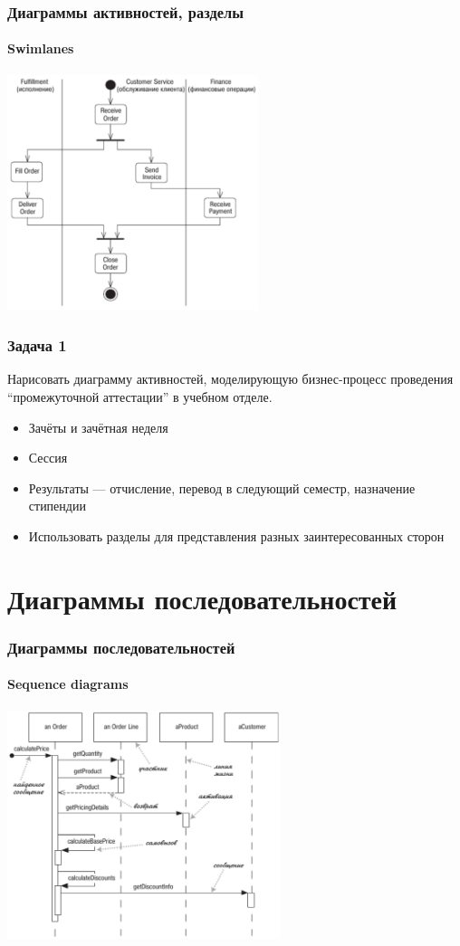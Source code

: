 \documentclass[xetex,mathserif,serif]{beamer}
\begin{document}
	\begin{frame}
		\frametitle{Диаграммы активностей, разделы}
		\framesubtitle{Swimlanes}
		\begin{center}
			\includegraphics[width=0.55\textwidth]{activitySwimlanes.png}
		\end{center}
	\end{frame}

	\begin{frame}
		\frametitle{Задача 1}
		Нарисовать диаграмму активностей, моделирующую бизнес-процесс проведения ``промежуточной аттестации'' в учебном отделе.
		\begin{itemize}
			\item Зачёты и зачётная неделя
			\item Сессия
			\item Результаты --- отчисление, перевод в следующий семестр, назначение стипендии
			\item Использовать разделы для представления разных заинтересованных сторон
		\end{itemize}
	\end{frame}

	\section{Диаграммы последовательностей}

	\begin{frame}
		\frametitle{Диаграммы последовательностей}
		\framesubtitle{Sequence diagrams}
		\begin{center}
			\includegraphics[width=0.6\textwidth]{sequenceDiagram.png}
		\end{center}
	\end{frame}
\end{document}
